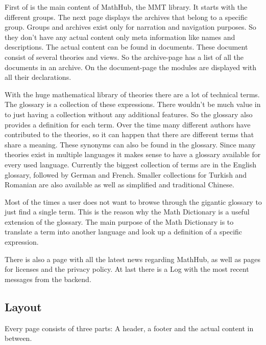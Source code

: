 \documentclass[11pt,a4paper]{article}
\begin{document}
 First of is the main content of MathHub, the MMT library.
It starts with the different groups.
The next page displays the archives that belong to a specific group.
Groups and archives exist only for narration and navigation purposes.
So they don't have any actual content only meta information like names and descriptions.
The actual content can be found in documents.
These document consist of several theories and views. 
So the archive-page has a list of all the documents in an archive.
On the document-page the modules are displayed with all their declarations.


With the huge mathematical library of theories there are a lot of technical terms.
The glossary is a collection of these expressions.
There wouldn't be much value in to just having a collection without any additional features.
So the glossary also provides a definition for each term.
Over the time many different authors have contributed to the theories, so it can happen that there are different terms that share a meaning.
These synonyms can also be found in the glossary.
Since many theories exist in multiple languages it makes sense to have a glossary available for every used language.
Currently the biggest collection of terms are in the English glossary, followed by German and French.
Smaller collections for Turkish and Romanian are also available as well as simplified and traditional Chinese. 

Most of the times a user does not want to browse through the gigantic glossary to just find a single term.
This is the reason why the Math Dictionary is a useful extension of the glossary.
The main purpose of the Math Dictionary is to translate a term into another language and look up a definition of a specific expression.


There is also a page with all the latest news regarding MathHub, as well as pages for licenses and the privacy policy. 
At last there is a Log with the most recent messages from the backend.
\subsection{Layout}
Every page consists of three parts: A header, a footer and the actual content in between.
\end{document}

